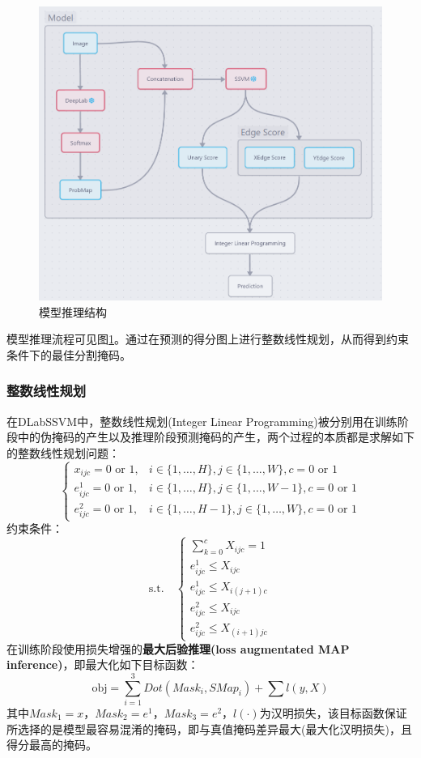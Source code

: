 \documentclass[a4paper,12pt]{ctexart}
\begin{document}
\begin{figure}[h!]
    \centering
    \includegraphics[width=\textwidth]{figures/DLabSSVM/DLabSSVM_inference.png}
    \caption{模型推理结构\label{fig:inference}}
\end{figure}

模型推理流程可见图\ref{fig:inference}。通过在预测的得分图上进行整数线性规划，从而得到约束条件下的最佳分割掩码。

\subsubsection{整数线性规划}
\label{sec:ILP}
在DLabSSVM中，整数线性规划(Integer Linear Programming)被分别用在训练阶段中的伪掩码的产生以及推理阶段预测掩码的产生，两个过程的本质都是求解如下的整数线性规划问题：
$$
\begin{cases}
x_{ijc} = 0 \text{ or } 1, & i \in \{1, \dots, H\}, j \in \{1, \dots, W\}, c = 0 \text{ or } 1 \\
e_{ijc}^1 = 0 \text{ or } 1, & i \in \{1, \dots, H\}, j \in \{1, \dots, W-1\}, c = 0 \text{ or } 1 \\
e_{ijc}^2 = 0 \text{ or } 1, & i \in \{1, \dots, H-1\}, j \in \{1, \dots, W\}, c = 0 \text{ or } 1
\end{cases}
$$
约束条件：
$$
\text{s.t.} \quad 
\begin{cases}
\sum_{k=0}^{c} X_{ijc} = 1 \\
e_{ijc}^1 \leq X_{ijc} \\
e_{ijc}^1 \leq X_{i(j+1)c} \\
e_{ijc}^2 \leq X_{ijc} \\
e_{ijc}^2 \leq X_{(i+1)jc}
\end{cases}
$$
在训练阶段使用损失增强的\textbf{最大后验推理(loss augmentated MAP inference)}，即最大化如下目标函数：
$$
\text{obj} = \sum_{i=1}^3 Dot(Mask_{i},SMap_{i}) + \sum l(y, X)
$$
其中$Mask_{1}=x，Mask_{2}=e^1，Mask_{3}=e^2$，$l(\cdot)$为汉明损失，该目标函数保证所选择的是模型最容易混淆的掩码，即与真值掩码差异最大(最大化汉明损失)，且得分最高的掩码。
\end{document}
